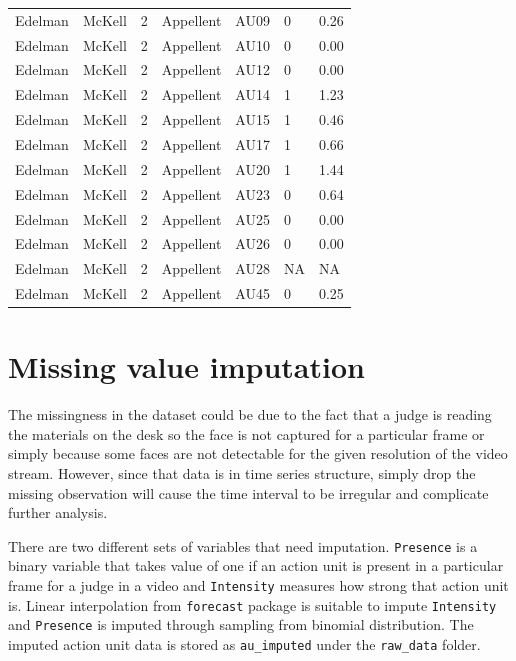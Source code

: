 \documentclass{monashthesis}
\begin{document}
\begin{table}[ht]
\begin{center}
\begin{tabular}{lllllll}
Edelman & McKell & 2 & Appellent & AU09 &  0 & 0.26 \\
Edelman & McKell & 2 & Appellent & AU10 &  0 & 0.00 \\
Edelman & McKell & 2 & Appellent & AU12 &  0 & 0.00 \\
Edelman & McKell & 2 & Appellent & AU14 &  1 & 1.23 \\
Edelman & McKell & 2 & Appellent & AU15 &  1 & 0.46 \\
Edelman & McKell & 2 & Appellent & AU17 &  1 & 0.66 \\
Edelman & McKell & 2 & Appellent & AU20 &  1 & 1.44 \\
Edelman & McKell & 2 & Appellent & AU23 &  0 & 0.64 \\
Edelman & McKell & 2 & Appellent & AU25 &  0 & 0.00 \\
Edelman & McKell & 2 & Appellent & AU26 &  0 & 0.00 \\
Edelman & McKell & 2 & Appellent & AU28 & NA &   NA \\
Edelman & McKell & 2 & Appellent & AU45 &  0 & 0.25 \\
\bottomrule
\end{tabular}
\end{center}
\end{table}

\hypertarget{missing-value-imputation}{%
\section{Missing value imputation}\label{missing-value-imputation}}

The missingness in the dataset could be due to the fact that a judge is reading the materials on the desk so the face is not captured for a particular frame or simply because some faces are not detectable for the given resolution of the video stream. However, since that data is in time series structure, simply drop the missing observation will cause the time interval to be irregular and complicate further analysis.

There are two different sets of variables that need imputation. \texttt{Presence} is a binary variable that takes value of one if an action unit is present in a particular frame for a judge in a video and \texttt{Intensity} measures how strong that action unit is. Linear interpolation from \texttt{forecast} package is suitable to impute \texttt{Intensity} and \texttt{Presence} is imputed through sampling from binomial distribution. The imputed action unit data is stored as \texttt{au\_imputed} under the \texttt{raw\_data} folder.
\end{document}
